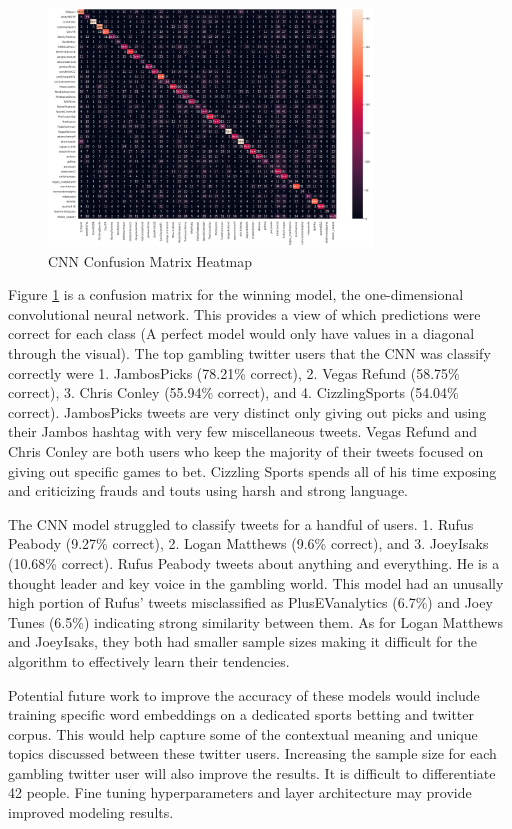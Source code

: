 \documentclass[5p,authoryear]{elsarticle}
\begin{document}
\begin{figure}[!htb] \centering
	\includegraphics[width=3.4in]{figures/CNN_Confusion_Matrix.png}
	\caption[]{CNN Confusion Matrix Heatmap} 
	\label{Confuse} 
\end{figure}




Figure \ref{Confuse} is a confusion matrix for the winning model, the one-dimensional convolutional neural network. This provides a view of which predictions were correct for each class (A perfect model would only have values in a diagonal through the visual). The top gambling twitter users that the CNN was classify correctly were 1. JambosPicks (78.21\% correct), 2. Vegas Refund (58.75\% correct), 3. Chris Conley (55.94\% correct), and 4. CizzlingSports (54.04\% correct). JambosPicks tweets are very distinct only giving out picks and using their Jambos hashtag with very few miscellaneous tweets. Vegas Refund and Chris Conley are both users who keep the majority of their tweets focused on giving out specific games to bet. Cizzling Sports spends all of his time exposing and criticizing frauds and touts using harsh and strong language.

The CNN model struggled to classify tweets for a handful of users. 1. Rufus Peabody (9.27\% correct), 2. Logan Matthews (9.6\% correct), and 3. JoeyIsaks (10.68\% correct). Rufus Peabody tweets about anything and everything. He is a thought leader and key voice in the gambling world. This model had an unusally high portion of Rufus’ tweets misclassified as PlusEVanalytics (6.7\%) and Joey Tunes (6.5\%) indicating strong similarity between them. As for Logan Matthews and JoeyIsaks, they both had smaller sample sizes making it difficult for the algorithm to effectively learn their tendencies.

Potential future work to improve the accuracy of these models would include training specific word embeddings on a dedicated sports betting and twitter corpus. This would help capture some of the contextual meaning and unique topics discussed between these twitter users. Increasing the sample size for each gambling twitter user will also improve the results. It is difficult to differentiate 42 people. Fine tuning hyperparameters and layer architecture may provide improved modeling results.
\end{document}
